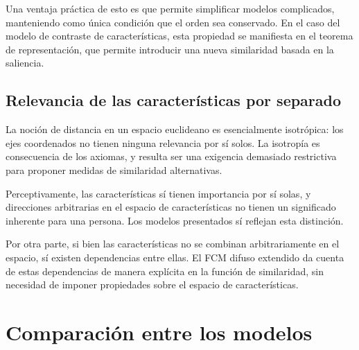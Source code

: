 \documentclass[spanish]{article}
\begin{document}
Una ventaja práctica de esto es que permite simplificar modelos complicados,
manteniendo como única condición que el orden sea conservado.  En el caso del
modelo de contraste de características, esta propiedad se manifiesta en el
teorema de representación, que permite introducir una nueva similaridad basada
en la saliencia.

\subsection{Relevancia de las características por separado}
La noción de distancia en un espacio euclideano es esencialmente isotrópica: los
ejes coordenados no tienen ninguna relevancia por sí solos.  La isotropía es
consecuencia de los axiomas, y resulta ser una exigencia demasiado restrictiva
para proponer medidas de similaridad alternativas.

Perceptivamente, las características sí tienen importancia por sí
solas, y direcciones arbitrarias en el espacio de características no tienen
un significado inherente para una persona.  Los modelos presentados sí reflejan
esta distinción.

Por otra parte, si bien las características no se combinan arbitrariamente en el
espacio, sí existen dependencias entre ellas.  El FCM difuso extendido da cuenta
de estas dependencias de manera explícita en la función de similaridad, sin
necesidad de imponer propiedades sobre el espacio de características.


\section{Comparación entre los modelos}


\end{document}
